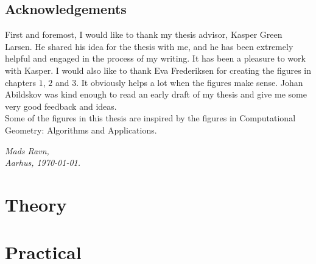 \documentclass[twoside,11pt,openright]{report}
\begin{document}
\chapter*{Acknowledgements}

First and foremost, I would like to thank my thesis advisor, Kasper Green Larsen. He shared his idea for the thesis with me, and he has been extremely helpful and engaged in the process of my writing. It has been a pleasure to work with Kasper.
I would also like to thank Eva Frederiksen for creating the figures in chapters $1$, $2$ and $3$. It obviously helps a lot when the figures make sense. Johan Abildskov was kind enough to read an early draft of my thesis and give me some very good feedback and ideas.\\

Some of the figures in this thesis are inspired by the figures in Computational Geometry: Algorithms and Applications\cite{compgeo}.

\vspace{2ex}
\begin{flushright}
  \emph{Mads Ravn,}\\
  \emph{Aarhus, \today.}
\end{flushright}

\tableofcontents
{}
\setcounter{secnumdepth}{2}





\part{Theory}




\part{Practical}







 

\end{document}

